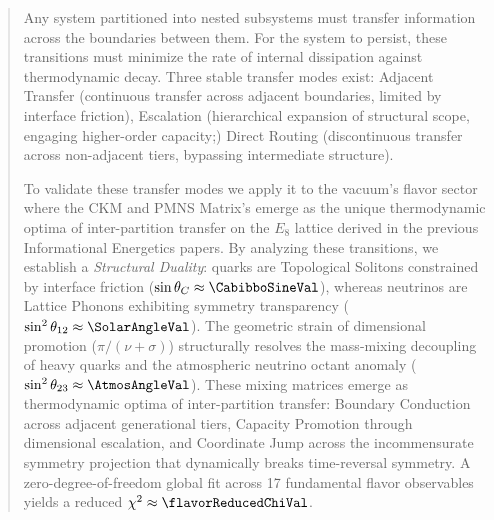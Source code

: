 
\begin{abstract}
Any system partitioned into nested subsystems must transfer information across the boundaries between them. For the system to persist, these transitions must minimize the rate of internal dissipation against thermodynamic decay. Three stable transfer modes exist: Adjacent Transfer (continuous transfer across adjacent boundaries, limited by interface friction), Escalation (hierarchical expansion of structural scope, engaging higher-order capacity;) Direct Routing (discontinuous transfer across non-adjacent tiers, bypassing intermediate structure).

To validate these transfer modes we apply it to the vacuum's flavor sector where the CKM and PMNS Matrix's emerge as the unique thermodynamic optima of inter-partition transfer on the $E_8$ lattice derived in the previous Informational Energetics papers. By analyzing these transitions, we establish a \textit{Structural Duality}: quarks are Topological Solitons constrained by interface friction ($\sin\theta_C \approx \CabibboSineVal$), whereas neutrinos are Lattice Phonons exhibiting symmetry transparency ($\sin^2\theta_{12} \approx \SolarAngleVal$). The geometric strain of dimensional promotion ($\pi/(\nu + \sigma)$) structurally resolves the mass-mixing decoupling of heavy quarks and the atmospheric neutrino octant anomaly ($\sin^2\theta_{23} \approx \AtmosAngleVal$). These mixing matrices emerge as thermodynamic optima of inter-partition transfer: Boundary Conduction across adjacent generational tiers, Capacity Promotion through dimensional escalation, and Coordinate Jump across the incommensurate symmetry projection that dynamically breaks time-reversal symmetry. A zero-degree-of-freedom global fit across 17 fundamental flavor observables yields a reduced $\chi^2 \approx \flavorReducedChiVal$.
\end{abstract}